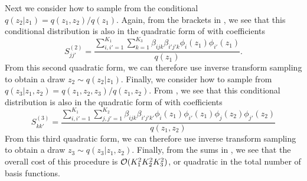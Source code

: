 Next we consider how to sample from the conditional
$q(z_2|z_1) = q(z_1,z_2)/q(z_1)$.
Again, from the brackets in , we see that this
conditional distribution is also in the quadratic form of 
with coefficients
\begin{equation}
    S_{jj'}^{(2)} = \frac{\sum_{i,i'=1}^{K_1}\sum_{k=1}^{K_3} \beta_{ijk}\beta_{i'j'k}\phi_i(z_1)\phi_{i'}(z_1)}{q(z_1)}.
\end{equation}
From this second quadratic form, we can therefore use inverse transform sampling
to obtain a draw $z_2 \sim q(z_2|z_1)$.
%
Finally, we consider how to sample from $q(z_3|z_1,z_2) = q(z_1,z_2,z_3)/q(z_1,z_2)$.
From , we see that this conditional distribution is also in
the quadratic form of  with coefficients
\begin{equation}
    S_{kk'}^{(3)} = \frac{\sum_{i,i'=1}^{K_1}\sum_{j,j'=1}^{K_2}\beta_{ijk}\beta_{i'j'k'}\phi_i(z_1)\phi_{i'}(z_1)\phi_j(z_2)\phi_{j'}(z_2)}
    {q(z_1,z_2)}
    \label{eq:sampling3}
\end{equation}
From this third quadratic form, we can therefore use inverse transform sampling to obtain a draw $z_3\sim q(z_3|z_1,z_2)$.
Finally, from the sums in , we see that the overall cost of
this procedure is $\mathcal{O}(K_1^2 K_2^2 K_3^2)$, or quadratic in the total number of
basis functions.


%

